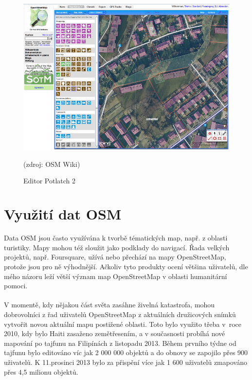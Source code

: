 \documentclass[11pt,a4paper,titlepage,oneside]{book}
\begin{document}
		\begin{figure}[!h]
			\begin{center}
				\includegraphics[width=12cm]{obrazky/p2_osm.png}
				\caption{Editor Potlatch 2}(zdroj: OSM Wiki\cite{wiki_p2})
			\end{center}
		\end{figure}

	\section{Využití dat \ac{OSM}}
		\paragraph{} Data \ac{OSM} jsou často využívána k tvorbě tématických map, např. z oblasti turistiky. Mapy mohou též sloužit jako podklady do navigací. Řada velkých projektů, např. Foursquare, užívá nebo přechází na mapy OpenStreetMap, protože jsou pro ně výhodnější. Ačkoliv tyto produkty ocení většina uživatelů, dle mého názoru leží větší význam map OpenStreetMap v oblasti humanitární pomoci.
		\paragraph{}V momentě, kdy nějakou část světa zasáhne živelná katastrofa, mohou dobrovolníci z řad uživatelů OpenStreetMap z aktuálních družicových snímků vytvořit novou aktuální mapu postižené oblasti. Toto bylo využito třeba v~roce 2010, kdy bylo Haiti zasaženo zemětřesením, a v současnosti probíhá nové mapování po tajfunu na Filipínách z listopadu 2013. Během prvního týdne od tajfunu bylo editováno víc jak 2 000 000 objektů a do obnovy se zapojilo přes 900 uživatelů. K 11.prosinci 2013 bylo za přispění více jak 1 600 uživatelů zmapováno přes 4,5 milionu objektů\cite{wiki_tajfun}.
\end{document}
